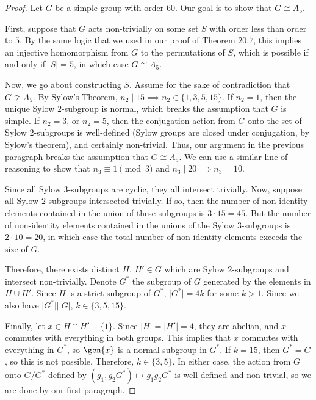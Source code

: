 \begin{proof}
Let $G$ be a simple group with order $60$. Our goal is to show that $G\cong A_5$. 

First, suppose that $G$ acts non-trivially on some set $S$ with order less than order to $5$. By the same logic that we used in our proof of Theorem $20.7$, this implies an injective homomorphism from $G$ to the permutations of $S$, which is possible if and only if $\vert S\vert = 5$, in which case $G\cong A_5$. 

Now, we go about constructing $S$. Assume for the sake of contradiction that $G\not\cong A_5$. By Sylow's Theorem, $n_2\mid 15\implies n_2\in\{1,3,5,15\}$. If $n_2=1$, then the unique Sylow $2$-subgroup is normal, which breaks the assumption that $G$ is simple. If $n_2=3$, or $n_2=5$, then the conjugation action from $G$ onto the set of Sylow $2$-subgroups is well-defined (Sylow groups are closed under conjugation, by Sylow's theorem), and certainly non-trivial. Thus, our argument in the previous paragraph breaks the assumption that $G\cong A_5$. We can use a similar line of reasoning to show that $n_3\equiv 1\pmod{3}$ and $n_3\mid 20 \implies n_3=10$. 

Since all Sylow $3$-subgroups are cyclic, they all intersect trivially. Now, suppose all Sylow $2$-subgroups intersected trivially. If so, then the number of non-identity elements contained in the union of these subgroups is $3\cdot 15=45$. But the number of non-identity elements contained in the unions of the Sylow $3$-subgroups is $2\cdot 10 = 20$, in which case the total number of non-identity elements exceeds the size of $G$. 

Therefore, there exists distinct $H$, $H'\in G$ which are Sylow $2$-subgroups and intersect non-trivially. Denote $G^*$ the subgroup of $G$ generated by the elements in $H\cup H'$. Since $H$ is a strict subgroup of $G^*$, $\vert G^*\vert = 4k$ for some $k > 1$. Since we also have $\vert G^*\vert \mid \vert G\vert$, $k\in \{3,5,15\}$. 

Finally, let $x\in H\cap H'-\{1\}$. Since $\vert H\vert = \vert H'\vert = 4$, they are abelian, and $x$ commutes with everything in both groups. This implies that $x$ commutes with everything in $G^*$, so $\gen{x}$ is a normal subgroup in $G^*$. If $k=15$, then $G^*=G$, so this is not possible. Therefore, $k\in\{3,5\}$. In either case, the action from $G$ onto $G/G^*$ defined by $(g_1, g_2G^*)\mapsto g_1g_2G^*$ is well-defined and non-trivial, so we are done by our first paragraph.  
\end{proof}